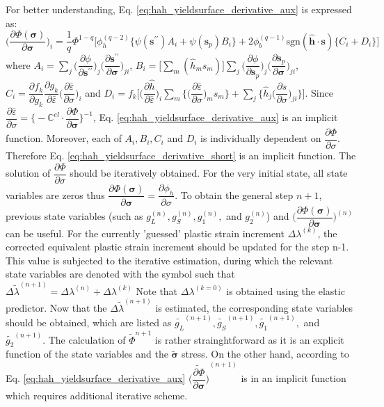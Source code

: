 \documentclass[12pt]{amsart}
\begin{document}
For better understanding, Eq. \ref{eq:hah_yieldsurface_derivative_aux} is expressed as:
\begin{equation}
  \label{eq:hah_yieldsurface_derivative_short}
  \bigg(\dfrac{\partial\Phi(\mathbf{\sigma})}{\partial\mathbf{\sigma}}\bigg)_i=\frac{1}{q}\Phi^{1-q}\bigg[\phi_h^{(q-2)}\bigg\{\psi(\mathbf{s}^{\prime\prime})A_i+\psi(\mathbf{s}_p)B_i\bigg\}+2\phi_b^{(q-1)}\text{sgn}(\hat{\mathbf{h}}\cdot\mathbf{s})\bigg\{C_i+ D_i\bigg\} \bigg]
\end{equation}
where $A_{i}=\sum_j\bigg(\dfrac{\partial\phi}{\partial\mathbf{s}^{\prime\prime}}\bigg)_{j}\bigg(\dfrac{\partial\mathbf{s}^{\prime\prime}}{\partial\mathbf{\sigma}}\bigg)_{ji}$, $B_{i}=\bigg[\sum_m(\hat{h}_ms_m)\bigg]\sum_j\bigg(\dfrac{\partial\phi}{\partial\mathbf{s}_p}\bigg)_{j}\bigg(\dfrac{\partial\mathbf{s}_p}{\partial\mathbf{\sigma}}\bigg)_{ji}$,$C_i=\dfrac{\partial f_k}{\partial g_k}\dfrac{\partial g_k}{\partial \bar{\varepsilon}}\bigg(\dfrac{\partial\bar{\varepsilon}}{\partial\sigma}\bigg)_{i}$ and $D_i= f_k\bigg[\bigg(\dfrac{\partial\hat{h}}{\partial\bar{\varepsilon}}\bigg)_i\sum_m\bigg\{{\bigg(\dfrac{\partial\bar{\varepsilon}}{\partial\sigma}\bigg)_m s_m}\bigg\}+\sum_j\bigg\{\hat{h}_j\bigg(\dfrac{\partial s}{\partial\sigma}\bigg)_{ji}\bigg\} \bigg]$.
Since $\dfrac{\partial\bar{\varepsilon}}{\partial\sigma}=\bigg\{-\mathbb{C}^{el}\cdot\dfrac{\partial\Phi}{\partial\mathbf{\sigma}}\bigg\}^{-1}$, Eq. \ref{eq:hah_yieldsurface_derivative_aux} is an implicit function.
Moreover, each of $A_i, B_i, C_i$ and $D_i$ is individually dependent on $\dfrac{\partial\Phi}{\partial\sigma}$. Therefore Eq. \ref{eq:hah_yieldsurface_derivative_short} is an implicit function.
The solution of $\dfrac{\partial\Phi}{\partial\sigma}$ should be iteratively obtained.
For the very initial state, all state variables are zeros thus $\dfrac{\partial\Phi(\mathbf{\sigma})}{\partial\mathbf{\sigma}}=\dfrac{\partial \phi_h}{\partial\sigma}$.
To obtain the general step $n+1$, previous state variables (such as $g_L^{(n)}, g_S^{(n)}, g_1^{(n)},$ and $g_2^{(n)}$) and $\bigg(\dfrac{\partial\Phi(\mathbf{\sigma})}{\partial\mathbf{\sigma}}\bigg)^{(n)}$ can be useful.
For the currently 'guessed' plastic strain increment $\Delta\lambda^{(k)}$, the corrected equivalent plastic strain increment should be updated for the step n-1.
This value is subjected to the iterative estimation, during which the relevant state variables are denoted with the symbol such that
$\Delta\tilde{\lambda}^{(n+1)}=\Delta\lambda^{(n)}+\Delta\lambda^{(k)}$
Note that $\Delta\lambda^{(k=0)}$ is obtained using the elastic predictor.
Now that the $\Delta\tilde{\lambda}^{(n+1)}$ is estimated, the corresponding state variables should be obtained, which are listed as $\tilde{g_L}^{(n+1)}, \tilde{g_S}^{(n+1)}, \tilde{g_1}^{(n+1)},$ and $\tilde{g_2}^{(n+1)}$.
The calculation of $\tilde{\Phi}^{n+1}$ is rather strainghtforward as it is an explicit function of the state variables and the $\tilde{\mathbf{\sigma}}$ stress.
On the other hand, according to Eq. \ref{eq:hah_yieldsurface_derivative_aux} $\tilde{\bigg(\dfrac{\partial\Phi}{\partial\mathbf{\sigma}}\bigg)}^{(n+1)}$ is in an implicit function which requires additional iterative scheme.
\end{document}
